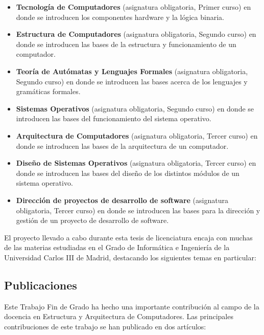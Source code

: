 \begin{itemize}

\item \textbf{Tecnología de Computadores} (asignatura obligatoria, Primer curso) en donde se introducen los componentes hardware y la lógica binaria.

\item \textbf{Estructura de Computadores} (asignatura obligatoria, Segundo curso) en donde se introducen las bases de la estructura y funcionamiento de un computador.

\item \textbf{Teoría de Autómatas y Lenguajes Formales} (asignatura obligatoria, Segundo curso) en donde se introducen las bases acerca de los lenguajes y gramáticas formales.

\item \textbf{Sistemas Operativos} (asignatura obligatoria, Segundo curso) en donde se introducen las bases del funcionamiento del sistema operativo.

\item \textbf{Arquitectura de Computadores} (asignatura obligatoria, Tercer curso) en donde se introducen las bases de la arquitectura de un computador.

\item \textbf{Diseño de Sistemas Operativos} (asignatura obligatoria, Tercer curso) en donde se introducen las bases del diseño de los distintos módulos de un sistema operativo.

\item \textbf{Dirección de proyectos de desarrollo de software} (asignatura obligatoria, Tercer curso) en donde se introducen las bases para la dirección y gestión de un proyecto de desarrollo de software.

\end{itemize}

El proyecto llevado a cabo durante esta tesis de licenciatura encaja con muchas de las materias estudiadas en el Grado de Informática e Ingeniería de la Universidad Carlos III de Madrid, destacando los siguientes temas en particular:

\subsection{Publicaciones}

Este Trabajo Fin de Grado ha hecho una importante contribución al campo de la docencia en Estructura y Arquitectura de Computadores. Las principales contribuciones de este trabajo se han publicado en dos artículos:

